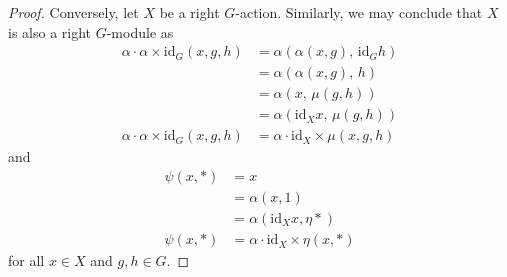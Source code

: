 \documentclass[ 12pt ]{article}
\begin{document}
\begin{enumerate}
\begin{proof}
			Conversely, let $X$ be a right $G$-action. Similarly, we may conclude that $X$ is also a right $G$-module as
			\begin{align*}
				\alpha \cdot \alpha \times \mathrm{id}_G (x, g, h) &= \alpha (\alpha(x, g),\, \mathrm{id}_G h) \\
				&= \alpha(\alpha(x, g),\, h) \\
				&= \alpha( x,\, \mu(g, h)) \\
				&= \alpha(\mathrm{id}_X x,\, \mu(g, h)) \\
				\alpha \cdot \alpha \times \mathrm{id}_G (x, g, h) &= \alpha \cdot \mathrm{id}_X \times \mu (x, g, h)
			\end{align*}
			and
			\begin{align*}
				\psi(x, \ast) &= x \\
				&= \alpha(x, 1) \\
				&= \alpha( \mathrm{id}_X x, \eta \ast) \\
				\psi(x, \ast) &= \alpha \cdot \mathrm{id}_X \times \eta(x, \ast)
			\end{align*}
			for all $x \in X$ and $g, h \in G$.
		\end{proof}

\end{enumerate}
\end{document}
